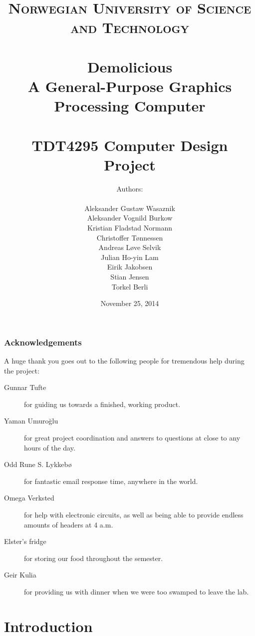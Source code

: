 \documentclass[a4paper, fontsize=11pt]{report} %
\title{ 
\normalfont \normalsize 
\textsc{Norwegian University of Science and Technology} \\ [25pt] %
\horrule{0.5pt} \\[0.4cm] %
\huge \textbf{Demolicious} \\ %
A General-Purpose Graphics Processing Computer \\
\horrule{2pt} \\[0.5cm] %
\large TDT4295 Computer Design Project \\
}
\author{Authors:\\ \\
Aleksander Gustaw Wasaznik\\
Aleksander Vognild Burkow\\
Kristian Fladstad Normann\\
Christoffer Tønnessen\\
Andreas Løve Selvik\\
Julian Ho-yin Lam\\
Eirik Jakobsen\\
Stian Jensen\\
Torkel Berli}
\date{\normalsize November 25, 2014}
\begin{document}

\maketitle

\newpage



\thispagestyle{firststyle}

\newpage



\newpage

\vspace*{\fill}
\section*{Acknowledgements}
A huge thank you goes out to the following people for tremendous help during the project:

\begin{description}

    \item[Gunnar Tufte]
        for guiding us towards a finished, working product.
    \item[Yaman Umuroğlu]
        for great project coordination and answers to questions at close to any hours of the day.
    \item[Odd Rune S. Lykkebø]
        for fantastic email response time, anywhere in the world.
    \item[Omega Verksted]
        for help with electronic circuits, as well as being able to provide endless amounts of headers at 4 a.m.
    \item[Elster's fridge]
        for storing our food throughout the semester.
    \item[Geir Kulia]
        for providing us with dinner when we were too swamped to leave the lab.

\end{description}
\vspace*{\fill}

\newpage

\tableofcontents

\setcounter{secnumdepth}{3}

\newpage


\part{Introduction}
\end{document}
